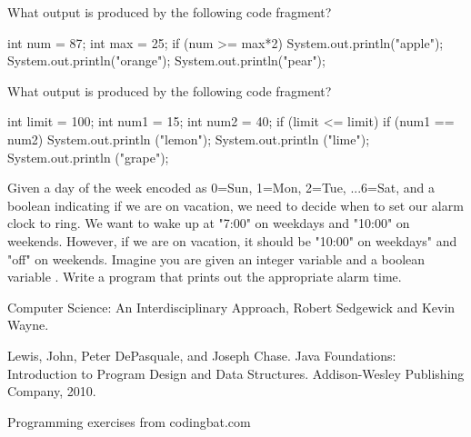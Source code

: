 \exercisesection

\begin{exercise}
What output is produced by the following code fragment?

\begin{code}
int num = 87;
int max = 25;
if (num >= max*2)
    System.out.println("apple");
    System.out.println("orange");
System.out.println("pear");
\end{code}
\end{exercise}

\begin{exercise}
What output is produced by the following code fragment?

\begin{code}
int limit = 100;
int num1 = 15;
int num2 = 40;
if (limit <= limit) {
    if (num1 == num2)
        System.out.println ("lemon");
    System.out.println ("lime");
}
System.out.println ("grape");
\end{code}
\end{exercise}

\begin{exercise}
Given a day of the week encoded as 0=Sun, 1=Mon, 2=Tue, ...6=Sat, and a boolean indicating if we are on vacation, we need to decide when to set our alarm clock to ring. We want to wake up at "7:00" on weekdays and "10:00" on weekends. However, if we are on vacation, it should be "10:00" on weekdays" and "off" on weekends. Imagine you are given an integer variable  and a boolean variable . Write a program that prints out the appropriate alarm time.
\end{exercise}


Computer Science: An Interdisciplinary Approach, Robert Sedgewick and Kevin Wayne.

Lewis, John, Peter DePasquale, and Joseph Chase. Java Foundations: Introduction to Program Design and Data Structures. Addison-Wesley Publishing Company, 2010.

Programming exercises from codingbat.com